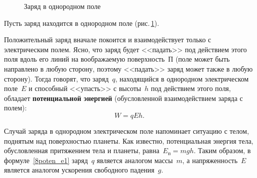 \documentclass[main.tex]{subfiles}
\begin{document}
{%
\setlength\intextsep{0pt}
\begin{figure}
    \centering
    \caption{Заряд в однородном поле}
    \label{fig:p101}
\end{figure}


Пусть заряд находится в однородном поле (рис.\,\ref{fig:p101}).














Положительный заряд вначале покоится и взаимодействует только с электрическим полем. Ясно, что заряд будет <<падать>> под действием этого поля вдоль его линий на воображаемую поверхность~П (поле может быть направлено в любую сторону, поэтому <<падать>> заряд может также в любую сторону). Тогда говорят, что заряд~$q$, находящийся в однородном электрическом поле~$E$ и способный <<упасть>> с высоты~$h$ под действием этого поля, обладает \textbf{потенциальной энергией} (обусловленной взаимодействием заряда с полем):
\begin{equation}
    \label{8poten_e1}
    W=qEh.
\end{equation}

}

Случай заряда в однородном электрическом поле напоминает ситуацию с телом, поднятым над поверхностью планеты. Как известно, потенциальная энергия тела, обусловленная притяжением тела и планеты, равна~$E_\text{п}=mgh$. Таким образом, в формуле~\eqref{8poten_e1} заряд~$q$ является аналогом массы~$m$, а напряженность~$E$ является аналогом ускорения свободного падения~$g$. 
\end{document}
